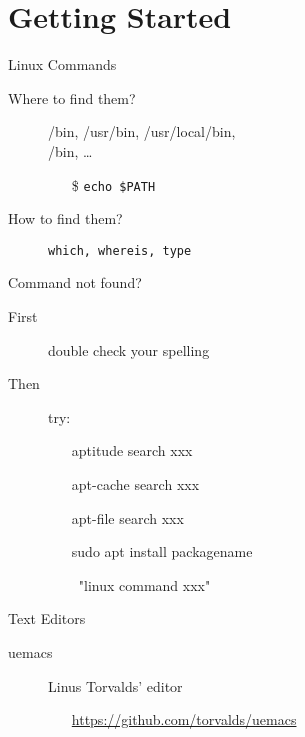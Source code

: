\mode*
\part{Getting Started}

\begin{frame}{Linux Commands}
  \begin{description}
  \item[Where to find them?] {\ttfamily /bin, /usr/bin, /usr/local/bin,\\/bin,
      \ldots}
    \begin{itemize}
    \item[\$] \texttt{echo \$PATH}
    \end{itemize}
  \item[How to find them?] \texttt{which, whereis, type}
  \end{description}
  \begin{block}{Command not found?}
    \begin{description}
    \item[First] double check your spelling
    \item[Then] try:{\ttfamily
      \begin{itemize}
      \item[\debian] aptitude search xxx
      \item[\debian] apt-cache search xxx
      \item[\debian] apt-file search xxx
      \item[\debian] sudo apt install packagename
      \item[\GG] \google~"linux command xxx"
      \end{itemize}}
    \end{description}
  \end{block}
\end{frame}

\begin{frame}{Text Editors}
  \begin{iblock}
    {
      }
    \begin{center}
    \end{center}
  \end{iblock}
  \begin{description}
  \item[uemacs] Linus Torvalds' editor
    \begin{itemize}
    \item[\github] \url{https://github.com/torvalds/uemacs}
    \end{itemize}
  \end{description}
\end{frame}

